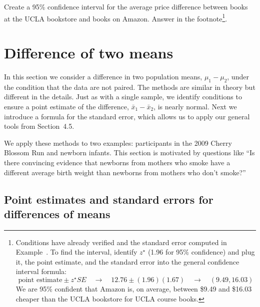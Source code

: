 \begin{exercise}
Create a 95\% confidence interval for the average price difference between books at the UCLA bookstore and books on Amazon. Answer in the footnote\footnote{Conditions have already verified and the standard error computed in Example~. To find the interval, identify $z^{\star}$ (1.96 for 95\% confidence) and plug it, the point estimate, and the standard error into the general confidence interval formula:
$$\text{point estimate} \pm z^{\star}SE \quad\to\quad 12.76 \pm (1.96)(1.67) \quad\to\quad (9.49, 16.03)$$
We are 95\% confident that Amazon is, on average, between \$9.49 and \$16.03 cheaper than the UCLA bookstore for UCLA course books.}.
\end{exercise}

\section{Difference of two means}
\label{differenceOfTwoMeans}

In this section we consider a difference in two population means, $\mu_1 - \mu_2$, under the condition that the data are not paired. The methods are similar in theory but different in the details. Just as with a single sample, we identify conditions to ensure a point estimate of the difference, $\bar{x}_1 - \bar{x}_2$, is nearly normal. Next we introduce a formula for the standard error, which allows us to apply our general tools from Section~4.5.

We apply these methods to two examples: participants in the 2009 Cherry Blossom Run and newborn infants. This section is motivated by questions like ``Is there convincing evidence that newborns from mothers who smoke have a different average birth weight than newborns from mothers who don't smoke?''

\subsection{Point estimates and standard errors for differences of means}

